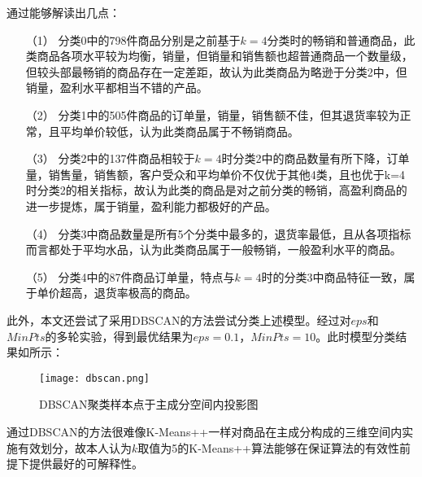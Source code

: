 \documentclass[lang=cn,11pt,a4paper,cite=authoryear]{elegantpaper}
\begin{document}
通过能够解读出几点：
\begin{itemize}
  \item [（1）] 
  分类0中的798件商品分别是之前基于$k=4$分类时的畅销和普通商品，此类商品各项水平较为均衡，销量，但销量和销售额也超普通商品一个数量级，但较头部最畅销的商品存在一定差距，故认为此类商品为略逊于分类2中，但销量，盈利水平都相当不错的产品。 
  \item [（2）]
  分类1中的505件商品的订单量，销量，销售额不佳，但其退货率较为正常，且平均单价较低，认为此类商品属于不畅销商品。
  \item [（3）]
  分类2中的137件商品相较于$k=4$时分类2中的商品数量有所下降，订单量，销售量，销售额，客户受众和平均单价不仅优于其他4类，且也优于k=4时分类2的相关指标，故认为此类的商品是对之前分类的畅销，高盈利商品的进一步提炼，属于销量，盈利能力都极好的产品。
  \item[（4）]
  分类3中商品数量是所有5个分类中最多的，退货率最低，且从各项指标而言都处于平均水品，认为此类商品属于一般畅销，一般盈利水平的商品。 
  \item[（5）]
  分类4中的87件商品订单量，特点与$k=4$时的分类3中商品特征一致，属于单价超高，退货率极高的商品。
\end{itemize}

此外，本文还尝试了采用DBSCAN的方法尝试分类上述模型。经过对$eps$和$MinPts$的多轮实验，得到最优结果为$eps=0.1$，$MinPts=10$。此时模型分类结果如所示：
\begin{figure}[H]
  \centering
  \texttt{[image: dbscan.png]}
  \caption{DBSCAN聚类样本点于主成分空间内投影图}
  \label{DBSCAN聚类二维三维图}
\end{figure}

通过DBSCAN的方法很难像K-Means++一样对商品在主成分构成的三维空间内实施有效划分，故本人认为$k$取值为5的K-Means++算法能够在保证算法的有效性前提下提供最好的可解释性。
\end{document}
